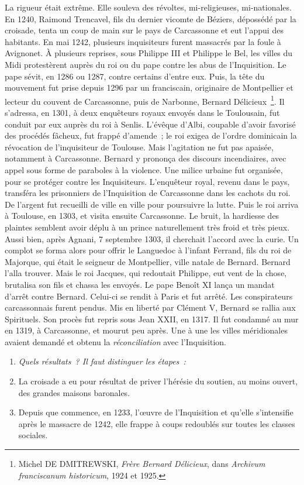 \documentclass[french,twoside]{book} %
\newlength{\listmod}
\newcommand{\listhead}[1]{\hspace{-1\listmod}\emph{#1}}
\begin{document}
La rigueur était extrême. Elle souleva des révoltes, mi-religieuses, mi-nationales. En 1240, Raimond Trencavel, fils du dernier vicomte de Béziers, dépossédé par la croisade, tenta un coup de main sur le pays de Carcassonne et eut l’appui des habitants. En mai 1242, plusieurs inquisiteurs furent massacrés par la foule à Avignonet. À plusieurs reprises, sous Philippe III et Philippe le Bel, les villes du Midi protestèrent auprès du roi ou du pape contre les abus de l’Inquisition. Le pape sévit, en 1286 ou 1287, contre certains d’entre eux. Puis, la tête du mouvement fut prise depuis 1296 par un franciscain, originaire de Montpellier et lecteur du couvent de Carcassonne, puis de Narbonne, Bernard Délicieux \footnote{ Michel DE DMITREWSKI, {\itshape Frère Bernard Délicieux}, dans {\itshape Archivum franciscanum historicum}, 1924 et 1925.}. Il s’adressa, en 1301, à deux enquêteurs royaux envoyés dans le Toulousain, fut conduit par eux auprès du roi à Senlis. L’évêque d’Albi, coupable d’avoir favorisé des procédés fâcheux, fut frappé d’amende ; le roi exigea de l’ordre dominicain la révocation de l’inquisiteur de Toulouse. Mais l’agitation ne fut pas apaisée, notamment à Carcassonne. Bernard y prononça des discours incendiaires, avec appel sous forme de paraboles à la violence. Une milice urbaine fut organisée, pour se protéger contre les Inquisiteurs. L’enquêteur royal, revenu dans le pays, transféra les prisonniers de l’Inquisition de Carcassonne dans les cachots du roi. De l’argent fut recueilli de ville en ville pour poursuivre la lutte. Puis le roi arriva à Toulouse, en 1303, et visita ensuite Carcassonne. Le bruit, la hardiesse des plaintes semblent avoir déplu à un prince naturellement très froid et très pieux. Aussi bien, après Agnani, 7 septembre 1303, il cherchait l’accord avec la curie. Un complot se forma alors pour offrir le Languedoc à l’infant Ferrand, fils du roi de Majorque, qui était le seigneur de Montpellier, ville natale de Bernard. Bernard l’alla trouver. Mais le roi Jacques, qui redoutait Philippe, eut vent de la chose, brutalisa son fils et chassa les envoyés. Le pape Benoît XI lança un mandat d’arrêt contre Bernard. Celui-ci se rendit à Paris et fut arrêté. Les conspirateurs carcassonnais furent pendus. Mis en liberté par Clément V, Bernard se rallia aux Spirituels. Son procès fut repris sous Jean XXII, en 1317. Il fut condamné au mur en 1319, à Carcassonne, et mourut peu après. Une à une les villes méridionales avaient demandé et obtenu la \emph{réconciliation} avec l’Inquisition.\par
\label{p108}
\begin{enumerate}[itemsep=0pt,]
\item[]\listhead{Quels résultats ? Il faut distinguer les étapes :}
\item La croisade a eu pour résultat de priver l’hérésie du soutien, au moins ouvert, des grandes maisons baronales.
\item Depuis que commence, en 1233, l’œuvre de l’Inquisition et qu’elle s’intensifie après le massacre de 1242, elle frappe à coups redoublés sur toutes les classes sociales.
\end{enumerate}
\end{document}
